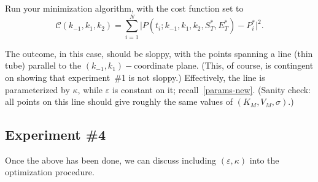 \documentclass{article}
\newcommand{\eps}{\varepsilon}
\newcommand{\be}{\begin{equation}}
\newcommand{\ee}{\end{equation}}
\begin{document}
Run your minimization algorithm,
with the cost function set to
%
\[
 \mathcal{C}(k_{-1},k_1,k_2)
=
 \sum_{i=1}^N
 \vert
 P(t_i ; k_{-1},k_1,k_2,S_T^*,E_T^*)
-
 P^*_i
 \vert^2 .
\]
%

The outcome, in this case, should be sloppy,
with the points spanning a line (thin tube)
parallel to the $(k_{-1},k_1)-$coordinate plane.
(This, of course, is contingent on showing that
experiment~\#1 is not sloppy.)
Effectively, the line is parameterized by $\kappa$,
while $\eps$ is constant on it; recall~\eqref{params-new}.
(Sanity check:
all points on this line should give roughly
the same values of $(K_M,V_M,\sigma)$.)

\subsection{Experiment \#4}
%
Once the above has been done,
we can discuss including $(\eps,\kappa)$
into the optimization procedure.


%
\end{document}
